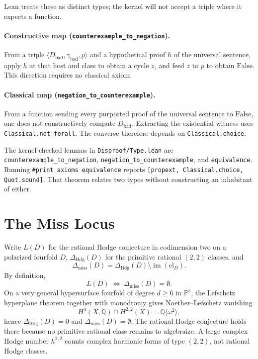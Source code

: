 \documentclass[11pt]{amsart}
\begin{document}
Lean treats these as distinct types; the kernel will not accept a triple where it expects a function.

\paragraph{\textbf{Constructive map (\texttt{counterexample\_to\_negation}).}}
From a triple $\langle D_{\mathrm{bad}},\gamma_{\mathrm{bad}},p\rangle$ and a hypothetical proof $h$ of the universal sentence, apply $h$ at that host and class to obtain a cycle $z$, and feed $z$ to $p$ to obtain $\mathrm{False}$. This direction requires no classical axiom.

\paragraph{\textbf{Classical map (\texttt{negation\_to\_counterexample}).}}
From a function sending every purported proof of the universal sentence to $\mathrm{False}$, one does not constructively compute $D_{\mathrm{bad}}$. Extracting the existential witness uses \texttt{Classical.not\_forall}. The converse therefore depends on \texttt{Classical.choice}.

The kernel-checked lemmas in \texttt{Disproof/Type.lean} are \texttt{counterexample\_to\_negation}, \texttt{negation\_to\_counterexample}, and \texttt{equivalence}. Running \texttt{\#print axioms equivalence} reports \texttt{[propext, Classical.choice, Quot.sound]}. That theorem relates two types without constructing an inhabitant of either.

\section{The Miss Locus}

Write $L(D)$ for the rational Hodge conjecture in codimension two on a polarized fourfold $D$, $\Delta_{\mathrm{Hdg}}(D)$ for the primitive rational $(2,2)$ classes, and
\[
  \Delta_{\mathrm{miss}}(D)=\Delta_{\mathrm{Hdg}}(D)\setminus\operatorname{im}(\mathrm{cl}_D).
\]
By definition,
\[
  L(D)\;\Longleftrightarrow\;\Delta_{\mathrm{miss}}(D)=\emptyset.
\]
On a very general hypersurface fourfold of degree $d\ge 6$ in $\mathbb{P}^5$, the Lefschetz hyperplane theorem together with monodromy gives Noether--Lefschetz vanishing
\[
  H^4(X,\mathbb{Q})\cap H^{2,2}(X)=\mathbb{Q}\langle\omega^2\rangle,
\]
hence $\Delta_{\mathrm{Hdg}}(D)=0$ and $\Delta_{\mathrm{miss}}(D)=\emptyset$. The rational Hodge conjecture holds there because no primitive rational class remains to algebraize. A large complex Hodge number $h^{2,2}$ counts complex harmonic forms of type $(2,2)$, not rational Hodge classes.
\end{document}
